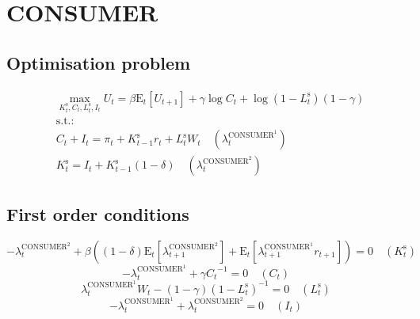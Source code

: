 

\section{CONSUMER}

\subsection{Optimisation problem}

\begin{align}
&\max_{K^{\mathrm{s}}_{t}, C_{t}, L^{\mathrm{s}}_{t}, I_{t}
} U_{t} = {\beta} {\mathrm{E}_{t}\left[U_{t+1}\right]} + {\gamma} {\log{C_{t}}} + {\log\left(1 - L^{\mathrm{s}}_{t}\right)} \left(1 - \gamma\right)\\
&\mathrm{s.t.:}\nonumber\\
& C_{t} + I_{t} = \pi_{t} + {K^{\mathrm{s}}_{t-1}} {r_{t}} + {L^{\mathrm{s}}_{t}} {W_{t}} \quad \left(\lambda^{\mathrm{CONSUMER}^{\mathrm{1}}}_{t}\right)\\
& K^{\mathrm{s}}_{t} = I_{t} + {K^{\mathrm{s}}_{t-1}} \left(1 - \delta\right) \quad \left(\lambda^{\mathrm{CONSUMER}^{\mathrm{2}}}_{t}\right)
\end{align}


\subsection{First order conditions}

\begin{equation}
-\lambda^{\mathrm{CONSUMER}^{\mathrm{2}}}_{t} + {\beta} \left(\left(1 - \delta\right) {\mathrm{E}_{t}\left[\lambda^{\mathrm{CONSUMER}^{\mathrm{2}}}_{t+1}\right]} + \mathrm{E}_{t}\left[{\lambda^{\mathrm{CONSUMER}^{\mathrm{1}}}_{t+1}} {r_{t+1}}\right]\right) = 0
 \quad \left(K^{\mathrm{s}}_{t}\right)
\end{equation}
\begin{equation}
-\lambda^{\mathrm{CONSUMER}^{\mathrm{1}}}_{t} + {\gamma} {C_{t}}^{-1} = 0
 \quad \left(C_{t}\right)
\end{equation}
\begin{equation}
{\lambda^{\mathrm{CONSUMER}^{\mathrm{1}}}_{t}} {W_{t}} - \left(1 - \gamma\right) \left(1 - L^{\mathrm{s}}_{t}\right)^{-1} = 0
 \quad \left(L^{\mathrm{s}}_{t}\right)
\end{equation}
\begin{equation}
-\lambda^{\mathrm{CONSUMER}^{\mathrm{1}}}_{t} + \lambda^{\mathrm{CONSUMER}^{\mathrm{2}}}_{t} = 0
 \quad \left(I_{t}\right)
\end{equation}




